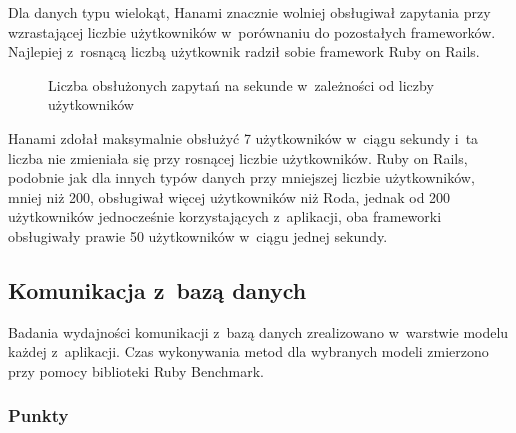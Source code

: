 \documentclass[printmode]{mgr}
\begin{document}
Dla danych typu wielokąt, Hanami znacznie wolniej obsługiwał zapytania przy wzrastającej liczbie użytkowników w~porównaniu do pozostałych frameworków. Najlepiej z~rosnącą liczbą użytkownik radził sobie framework Ruby on Rails.

\begin{figure}[H]
  \centering
  \caption{Liczba obsłużonych zapytań na sekunde w~zależności od liczby użytkowników}
  \label{fig:load_rps_polygon}
\end{figure}

Hanami zdołał maksymalnie obsłużyć 7 użytkowników w~ciągu sekundy i~ta liczba nie zmieniała się przy rosnącej liczbie użytkowników. Ruby on Rails, podobnie jak dla innych typów danych przy mniejszej liczbie użytkowników, mniej niż 200, obsługiwał więcej użytkowników niż Roda, jednak od 200 użytkowników jednocześnie korzystających z~aplikacji, oba frameworki obsługiwały prawie 50 użytkowników w~ciągu jednej sekundy.

\subsection{Komunikacja z~bazą danych}

Badania wydajności komunikacji z~bazą danych zrealizowano w~warstwie modelu każdej z~aplikacji. Czas wykonywania metod dla wybranych modeli zmierzono przy pomocy biblioteki Ruby Benchmark.

\subsubsection{Punkty}
\end{document}
